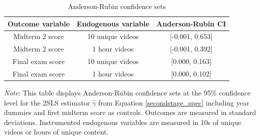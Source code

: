 \documentclass[12pt]{article}
\newcommand{\Fignote}[1]{
	\begin{tablenotes}[para,flushleft]\footnotesize
		\textit{Note}: #1
	\end{tablenotes}
}
\begin{document}
\clearpage


\clearpage
\begin{spacing}{1.0}
\begin{table} \centering \caption{Anderson-Rubin confidence sets}
\label{arci_table}
\begin{threeparttable}
\begin{tabular}{ ccc }
\toprule
Outcome variable & Endogenous variable & Anderson-Rubin CI \\
\midrule
Midterm 2 score & 10 unique videos & [-0.001, 0.653] \\
Midterm 2 score & 1 hour videos & [-0.001, 0.392] \\
Final exam score & 10 unique videos & [0.000, 0.163] \\
Final exam score & 1 hour videos & [0.000, 0.102] \\
\bottomrule
\end{tabular}
\Fignote{This table displays Anderson-Rubin confidence sets at the 95\% confidence level for the 2SLS estimator $\hat{\gamma}$ from Equation \ref{secondstage_spec} including year dummies and first midterm score as controls. Outcomes are measured in standard deviations. Instrumented endogenous variables are measured in 10s of unique videos or hours of unique content.}
\end{threeparttable}
\end{table}
\end{spacing}
\end{document}
